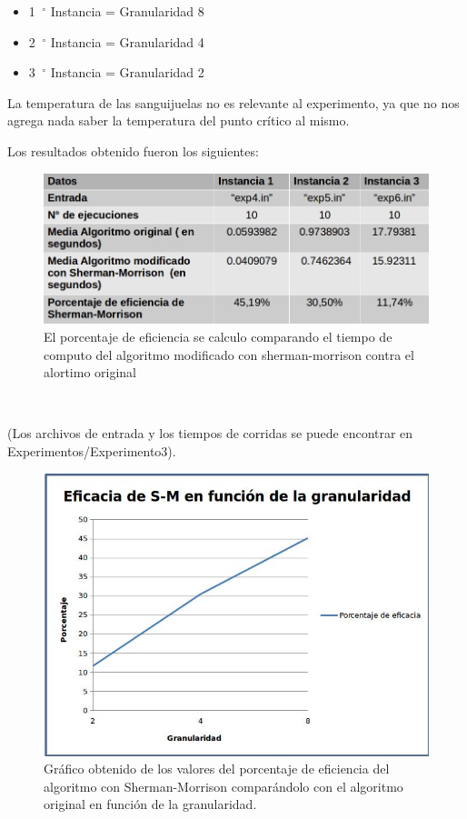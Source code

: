      \begin{itemize}
    \item 1\hspace{-1.5mm}$\phantom{a}^{\circ}$ Instancia = Granularidad 8
    \item 2\hspace{-1.5mm}$\phantom{a}^{\circ}$ Instancia = Granularidad 4
    \item 3\hspace{-1.5mm}$\phantom{a}^{\circ}$ Instancia  = Granularidad 2
 \end{itemize}
 

  La temperatura de las sanguijuelas no es relevante al experimento, ya que no nos agrega nada saber la temperatura del punto crítico al mismo.
  
  Los resultados obtenido fueron los siguientes:
  
     \begin{figure}[H]
    \centering
    \includegraphics[scale=0.5]{graphs/grafico3.jpg}\caption{El porcentaje de eficiencia se calculo comparando el tiempo de computo del algoritmo modificado con sherman-morrison contra el alortimo original}
    \end{figure}\
        
         (Los archivos de entrada y los tiempos de corridas se puede encontrar en Experimentos/Experimento3).


    \begin{figure}[H]
    \centering
    \includegraphics[scale=0.6]{graphs/graf.jpg}\caption{Gráfico obtenido de los valores del porcentaje de eficiencia del algoritmo con Sherman-Morrison comparándolo con el algoritmo original en función de la granularidad.}
    \end{figure}




